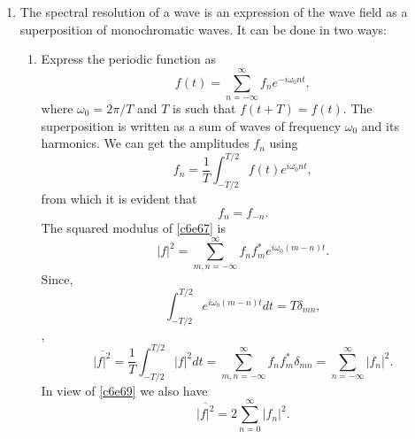 \begin{enumerate}
\item The spectral resolution of a wave is an expression of the wave field as a
superposition of monochromatic waves. It can be done in two ways:
\begin{enumerate}
\item Express the periodic function as
\begin{equation}\label{c6e67}
f(t) = \sum_{n=-\infty}^\infty f_n e^{-i\omega_0 nt},
\end{equation}
where $\omega_0 = 2\pi/T$ and $T$ is such that $f(t + T) = f(t)$. The superposition
is written as a sum of waves of frequency $\omega_0$ and its harmonics. We can 
get the amplitudes $f_n$ using
\begin{equation}\label{c6e68}
f_n = \frac{1}{T}\int_{-T/2}^{T/2} f(t)e^{i\omega_0 nt},
\end{equation}
from which it is evident that
\begin{equation}\label{c6e69}
f_n = f_{-n}.
\end{equation}
The squared modulus of \eqref{c6e67} is
\begin{equation}\label{c6e70}
|f|^2 = \sum_{m, n = -\infty}^\infty f_n f_m^\ast e^{i\omega_0(m - n)t}.
\end{equation}
Since,
\begin{equation}\label{c6e71}
\int_{-T/2}^{T/2}e^{i\omega_0(m - n)t}dt = T\delta_{mn},
\end{equation},
\begin{equation}\label{c6e71}
\overline{|f|^2} = \frac{1}{T}\int_{-T/2}^{T/2}|f|^2 dt = 
\sum_{m, n = -\infty}^\infty f_n f_m^\ast \delta_{mn} = 
\sum_{n=-\infty}^\infty |f_n|^2.
\end{equation}
In view of \eqref{c6e69} we also have
\begin{equation}\label{c6e72}
\overline{|f|^2} = 2\sum_{n=0}^\infty |f_n|^2.
\end{equation}


\end{enumerate}
\end{enumerate}
